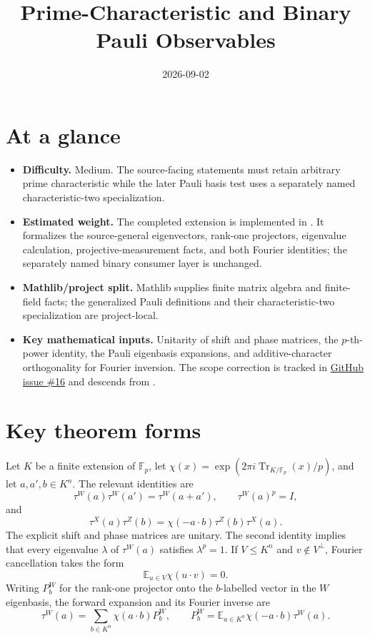 \documentclass[11pt]{article}
\title{Prime-Characteristic and Binary Pauli Observables}
\author{}
\date{2026-09-02}
\begin{document}
\maketitle
\section{At a glance}
\begin{itemize}
  \item \textbf{Difficulty.} Medium.  The source-facing statements must retain
  arbitrary prime characteristic while the later Pauli basis test uses a
  separately named characteristic-two specialization.
  \item \textbf{Estimated weight.} The completed extension is implemented in
  .  It formalizes the
  source-general eigenvectors, rank-one projectors, eigenvalue calculation,
  projective-measurement facts, and both Fourier identities; the separately
  named binary consumer layer is unchanged.
  \item \textbf{Mathlib/project split.} Mathlib supplies finite matrix algebra
  and finite-field facts; the generalized Pauli definitions and their
  characteristic-two specialization are project-local.
  \item \textbf{Key mathematical inputs.} Unitarity of shift and phase
  matrices, the $p$-th-power identity, the Pauli eigenbasis expansions, and
  additive-character orthogonality for Fourier inversion.
  The scope correction is tracked in
  \href{https://github.com/Dengnifer/MIPStarRE-QPBT/issues/16}{GitHub issue \#16}
  and descends from .
\end{itemize}

\section{Key theorem forms}
Let $K$ be a finite extension of $\mathbb F_p$, let
$\chi(x)=\exp(2\pi i\operatorname{Tr}_{K/\mathbb F_p}(x)/p)$, and let
$a,a',b\in K^n$.  The relevant identities are
\[
 \tau^W(a)\tau^W(a')=\tau^W(a+a'),\qquad
 \tau^W(a)^p=I,
\]
and
\[
 \tau^X(a)\tau^Z(b)=\chi(-a\mathbin{\cdot}b)
 \tau^Z(b)\tau^X(a).
\]
The explicit shift and phase matrices are unitary. The second identity implies
that every eigenvalue $\lambda$ of $\tau^W(a)$ satisfies $\lambda^p=1$. If
$V\leq K^n$ and $v\notin V^\perp$, Fourier cancellation takes the form
\[
 \mathbb E_{u\in V}\chi(u\mathbin{\cdot}v)=0.
\]
Writing $P_b^W$ for the rank-one projector onto the $b$-labelled vector in the
$W$ eigenbasis, the forward expansion and its Fourier inverse are
\[
 \tau^W(a)=\sum_{b\in K^n}\chi(a\mathbin{\cdot}b)P_b^W,
 \qquad
 P_b^W=\mathbb E_{a\in K^n}\chi(-a\mathbin{\cdot}b)\tau^W(a).
\]
\end{document}
